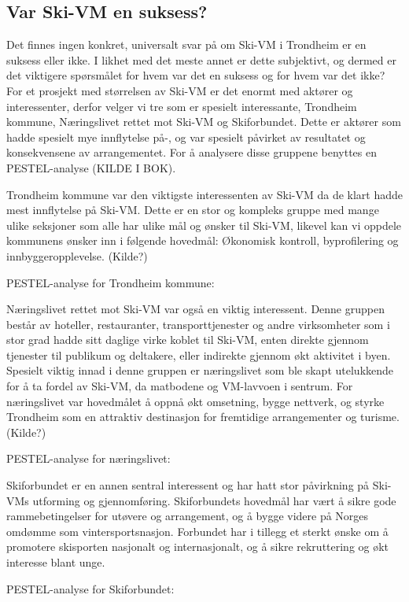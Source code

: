 \subsection{Var Ski-VM en suksess?}
Det finnes ingen konkret, universalt svar på om Ski-VM i Trondheim er en suksess eller ikke.  I likhet med det meste annet er dette subjektivt, og dermed er det viktigere spørsmålet for hvem var det en suksess og for hvem var det ikke? For et prosjekt med størrelsen av Ski-VM er det enormt med aktører og interessenter, derfor velger vi tre som er spesielt interessante, Trondheim kommune, Næringslivet rettet mot Ski-VM og Skiforbundet. Dette er aktører som hadde spesielt mye innflytelse på-, og var spesielt påvirket av resultatet og konsekvensene av arrangementet. For å analysere disse gruppene benyttes en PESTEL-analyse (KILDE I BOK).

Trondheim kommune var den viktigste interessenten av Ski-VM da de klart hadde mest innflytelse på Ski-VM. Dette er en stor og kompleks gruppe med mange ulike seksjoner som alle har ulike mål og ønsker til Ski-VM, likevel kan vi oppdele kommunens ønsker inn i følgende hovedmål: Økonomisk kontroll, byprofilering og innbyggeropplevelse. (Kilde?)

PESTEL-analyse for Trondheim kommune:

Næringslivet rettet mot Ski-VM var også en viktig interessent. Denne gruppen består av hoteller, restauranter, transporttjenester og andre virksomheter som i stor grad hadde sitt daglige virke koblet til Ski-VM, enten direkte gjennom tjenester til publikum og deltakere, eller indirekte gjennom økt aktivitet i byen. Spesielt viktig innad i denne gruppen er næringslivet som ble skapt utelukkende for å ta fordel av Ski-VM, da matbodene og VM-lavvoen i sentrum. For næringslivet var hovedmålet å oppnå økt omsetning, bygge nettverk, og styrke Trondheim som en attraktiv destinasjon for fremtidige arrangementer og turisme. (Kilde?)

PESTEL-analyse for næringslivet:


Skiforbundet er en annen sentral interessent og har hatt stor påvirkning på Ski-VMs utforming og gjennomføring. Skiforbundets hovedmål har vært å sikre gode rammebetingelser for utøvere og arrangement, og å bygge videre på Norges omdømme som vintersportsnasjon. Forbundet har i tillegg et sterkt ønske om å promotere skisporten nasjonalt og internasjonalt, og å sikre rekruttering og økt interesse blant unge.

PESTEL-analyse for Skiforbundet:

